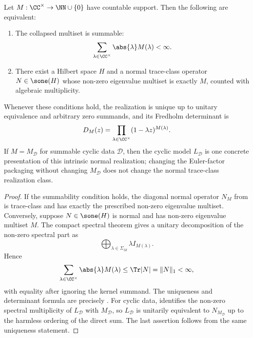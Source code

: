 \begin{corollary}
  \label{cor:arbitrary-collapsed-multiset-normal-realization}
  Let \(M:\CC^\times\to\NN\cup\{0\}\) have countable support. Then the
  following are equivalent:
  \begin{enumerate}[label=\textup{(\roman*)}]
    \item The collapsed multiset is summable:
      \[
        \sum_{\lambda\in\CC^\times}\abs{\lambda}M(\lambda)<\infty.
      \]
    \item There exist a Hilbert space \(H\) and a normal trace-class
      operator \(N\in\sone(H)\) whose non-zero eigenvalue multiset is
      exactly \(M\), counted with algebraic multiplicity.
  \end{enumerate}
  Whenever these conditions hold, the realization is unique up to unitary
  equivalence and arbitrary zero summands, and its Fredholm determinant is
  \[
    D_M(z)=\prod_{\lambda\in\CC^\times}(1-\lambda z)^{M(\lambda)}.
  \]
  If \(M=M_{\mathcal D}\) for summable cyclic data \(\mathcal D\), then the
  cyclic model \(L_{\mathcal D}\) is one concrete presentation of this
  intrinsic normal realization; changing the Euler-factor packaging without
  changing \(M_{\mathcal D}\) does not change the normal trace-class
  realization class.
\end{corollary}

\begin{proof}
  If the summability condition holds, the diagonal normal operator \(N_M\)
  from  is trace-class and
  has exactly the prescribed non-zero eigenvalue multiset. Conversely,
  suppose \(N\in\sone(H)\) is normal and has non-zero eigenvalue multiset
  \(M\). The compact spectral theorem gives a unitary decomposition of the
  non-zero spectral part as
  \[
    \bigoplus_{\lambda\in\Sigma_M}\lambda I_{M(\lambda)}.
  \]
  Hence
  \[
    \sum_{\lambda\in\CC^\times}\abs{\lambda}M(\lambda)
    \le \Tr|N|=\|N\|_1<\infty,
  \]
  with equality after ignoring the kernel summand. The uniqueness and
  determinant formula are precisely
  . For cyclic data,
   identifies the non-zero
  spectral multiplicity of \(L_{\mathcal D}\) with \(M_{\mathcal D}\), so
  \(L_{\mathcal D}\) is unitarily equivalent to \(N_{M_{\mathcal D}}\) up
  to the harmless ordering of the direct sum. The last assertion follows
  from the same uniqueness statement.
\end{proof}

